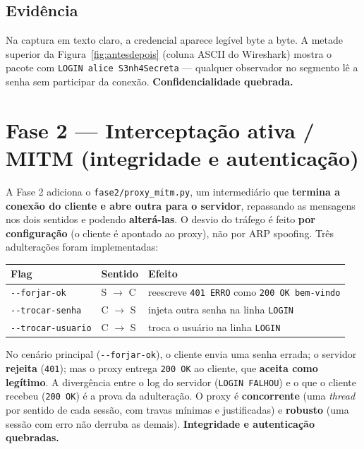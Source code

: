 \documentclass[11pt,a4paper]{article}
\newcommand{\seta}{\texorpdfstring{$\rightarrow$}{->}}
\begin{document}
\subsection{Evidência}
Na captura em texto claro, a credencial aparece legível byte a byte. A metade
superior da Figura~\ref{fig:antesdepois} (coluna ASCII do Wireshark) mostra o
pacote com \texttt{LOGIN alice S3nh4Secreta} — qualquer observador no segmento lê
a senha sem participar da conexão. \textbf{Confidencialidade quebrada.}

\section{Fase 2 — Interceptação ativa / MITM (integridade e autenticação)}

A Fase 2 adiciona o \texttt{fase2/proxy\_mitm.py}, um intermediário que
\textbf{termina a conexão do cliente e abre outra para o servidor}, repassando as
mensagens nos dois sentidos e podendo \textbf{alterá-las}. O desvio do tráfego é
feito \textbf{por configuração} (o cliente é apontado ao proxy), não por ARP
spoofing. Três adulterações foram implementadas:

\begin{center}\small
\begin{tabular}{@{}lll@{}}
\toprule
Flag & Sentido & Efeito \\
\midrule
\texttt{-{}-forjar-ok} & S \seta{} C & reescreve \texttt{401 ERRO} como \texttt{200 OK bem-vindo} \\
\texttt{-{}-trocar-senha} & C \seta{} S & injeta outra senha na linha \texttt{LOGIN} \\
\texttt{-{}-trocar-usuario} & C \seta{} S & troca o usuário na linha \texttt{LOGIN} \\
\bottomrule
\end{tabular}
\end{center}

No cenário principal (\texttt{-{}-forjar-ok}), o cliente envia uma senha errada; o
servidor \textbf{rejeita} (\texttt{401}); mas o proxy entrega \texttt{200 OK} ao
cliente, que \textbf{aceita como legítimo}. A divergência entre o log do servidor
(\texttt{LOGIN FALHOU}) e o que o cliente recebeu (\texttt{200 OK}) é a prova da
adulteração. O proxy é \textbf{concorrente} (uma \textit{thread} por sentido de
cada sessão, com travas mínimas e justificadas) e \textbf{robusto} (uma sessão
com erro não derruba as demais). \textbf{Integridade e autenticação quebradas.}
\end{document}

